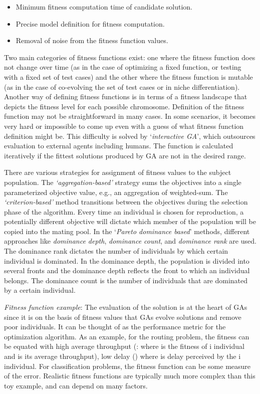 \documentclass[journal]{IEEEtran}
\begin{document}
\begin{itemize}
\item Minimum fitness computation time of candidate solution. 
\item Precise model definition for fitness computation.
\item Removal of noise from the fitness function values. 
\end{itemize}

Two main categories of fitness functions exist: one where the fitness function does not change over time (as in the case of optimizing a fixed function, or testing with a fixed set of test cases) and the other where the fitness function is mutable (as in the case of co-evolving the set of test cases or in niche differentiation). Another way of defining fitness functions is in terms of a fitness landscape that depicts the fitness level for each possible chromosome. Definition of the fitness function may not be straightforward in many cases. In some scenarios, it becomes very hard or impossible to come up even with a guess of what fitness function definition might be. This difficulty is solved by `\textit{interactive GA}', which outsources evaluation to external agents including humans. The function is calculated iteratively if the fittest solutions produced by GA are not in the desired range.  

There are various strategies for assignment of fitness values to the subject population. The \textit{`aggregation-based'} strategy sums the objectives into a single parameterized objective value, e.g., an aggregation of weighted-sum. The \textit{`criterion-based'} method transitions between the objectives during the selection phase of the algorithm. Every time an individual is chosen for reproduction, a potentially different objective will dictate which member of the population will be copied into the mating pool. In the `\textit{Pareto dominance based}' methods, different approaches like \textit{dominance depth}, \textit{dominance count}, and \textit{dominance rank} are used. The dominance rank dictates the number of individuals by which certain individual is dominated. In the dominance depth, the population is divided into several fronts and the dominance depth reflects the front to which an individual belongs. The dominance count is the number of individuals that are dominated by a certain individual.

\emph{Fitness function example}: The evaluation of the solution is at the heart of GAs since it is on the basis of fitness values that GAs evolve solutions and remove poor individuals. It can be thought of as the performance metric for the optimization algorithm. As an example, for the routing problem, the fitness can be equated with high average throughput (: where  is the fitness of i individual and  is its average throughput), low delay () where  is delay perceived by the i individual. For classification problems, the fitness function can be some measure of the error. Realistic fitness functions are typically much more complex than this toy example, and can depend on many factors.
\end{document}
